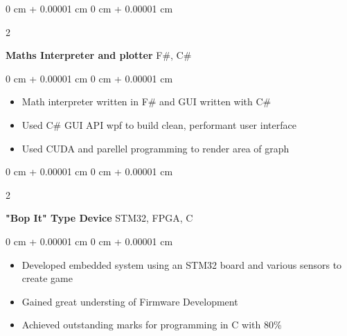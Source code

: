\documentclass[10pt, letterpaper]{article}
\newenvironment{highlights}{
    \begin{itemize}[
        topsep=0.10 cm,
        parsep=0.10 cm,
        partopsep=0pt,
        itemsep=0pt,
        leftmargin=0 cm + 10pt
    ]
}{
    \end{itemize}
} %
\newenvironment{onecolentry}{
    \begin{adjustwidth}{
        0 cm + 0.00001 cm
    }{
        0 cm + 0.00001 cm
    }
}{
    \end{adjustwidth}
} %
\newenvironment{twocolentry}[2][]{
    \onecolentry
    \def\secondColumn{#2}
    \setcolumnwidth{\fill, 4.5 cm}
    \begin{paracol}{2}
}{
    \switchcolumn \raggedleft \secondColumn
    \end{paracol}
    \endonecolentry
} %
\begin{document}
    \vspace{0.2 cm}



    \begin{twocolentry}{
        F\#, C\#
    }
        \textbf{Maths Interpreter and plotter}\end{twocolentry}
    \vspace{0.10 cm}
    \begin{onecolentry}
        \begin{highlights}
            \item Math interpreter written in F\# and GUI written with C\#
            \item Used C\# GUI API wpf to build clean, performant user interface
            \item Used CUDA and parellel programming to render area of graph
        \end{highlights}
    \end{onecolentry}

    \vspace{0.2 cm}

    \begin{twocolentry}{
        STM32, FPGA, C
    }
        \textbf{"Bop It" Type Device}\end{twocolentry}

    \vspace{0.10 cm}
    \begin{onecolentry}
        \begin{highlights}
            \item Developed embedded system using an STM32 board and various sensors to create game 
            \item Gained great understing of Firmware Development
            \item Achieved outstanding marks for programming in C with 80\%
        \end{highlights}
    \end{onecolentry}
\end{document}
